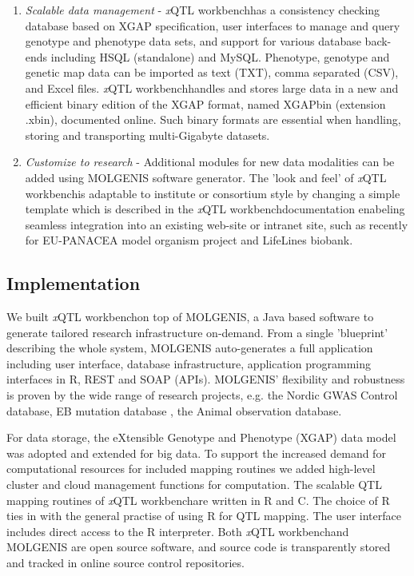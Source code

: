 \documentclass[8pt, twoside, a5paper]{report}
\newcommand{\italic}[1]{\textit{#1}}
\newcommand{\xqtlwb}{{\it x}QTL workbench}
\begin{document}
\begin{enumerate}
\item \italic{Scalable data management} - \xqtlwb has a consistency checking database based on XGAP specification\cite{Swertz:2010a}, 
user interfaces to manage and query genotype and phenotype data sets, and support for various database back-ends including 
HSQL (standalone) and MySQL. Phenotype, genotype and genetic map data can be imported as text (TXT), comma separated (CSV), 
and Excel files. \xqtlwb handles and stores large data in a new and efficient binary edition of the XGAP format, named 
XGAPbin (extension .xbin), documented online. Such binary formats are essential when handling, storing and transporting 
multi-Gigabyte datasets.

\item \italic{Customize to research} - Additional modules for new data modalities can be added using MOLGENIS software 
generator\cite{Swertz:2010b}. The 'look and feel' of \xqtlwb is adaptable to institute or consortium style by changing a 
simple template which is described in the \xqtlwb documentation enabeling seamless integration into an existing web-site
or intranet site, such as recently for EU-PANACEA model organism project and LifeLines biobank.
\end{enumerate}

\subsection{Implementation}

We built \xqtlwb on top of MOLGENIS\cite{Swertz:2004}, a Java based software to generate tailored research infrastructure 
on-demand\cite{Swertz:2007}. From a single 'blueprint' describing the whole system, MOLGENIS auto-generates a full 
application including user interface, database infrastructure, application programming interfaces in R, REST and SOAP 
(APIs). MOLGENIS' flexibility and robustness is proven by the wide range of research projects, e.g. the Nordic GWAS 
Control database\cite{Leu:2010}, EB mutation database \cite{Akker:2011}, the Animal observation database\cite{Swertz:2010b}.

For data storage, the eXtensible Genotype and Phenotype (XGAP) data model was adopted\cite{Swertz:2010a} and extended 
for big data. To support the increased demand for computational resources for included mapping routines we added high-level 
cluster and cloud management functions for computation. The scalable QTL mapping routines of \xqtlwb are written in R 
and C. The choice of R ties in with the general practise of using R for QTL mapping. The user interface includes direct 
access to the R interpreter.  Both \xqtlwb and MOLGENIS are open source software, and source code is transparently
stored and tracked in online source control repositories.
\end{document}
